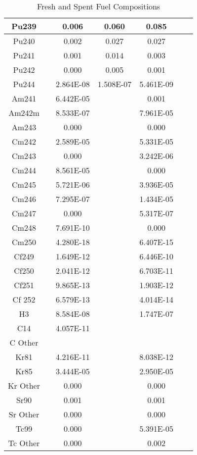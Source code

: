 \begin{frame}
\begin{table}[h]
{\begin{tabular}{|c|c|c|c|c|c|c|}
		 Pu239	 & 	 	& 	0.006 & 	0.060 & 	0.085 \\ \hline 
		 Pu240	 & 	 	& 	0.002 & 	0.027 & 	0.027 \\ \hline 
		 Pu241	 & 	 	& 	0.001 & 	0.014 & 	0.003 \\ \hline 
		 Pu242	 & 	 	& 	0.000 & 	0.005 & 	0.001 \\ \hline 
		 Pu244	 & 	 	& 	2.864E-08 & 1.508E-07 & 	5.461E-09 \\ \hline 
		 Am241	 & 	 	& 	6.442E-05 & 	 	 & 	0.001 \\ \hline 
		 Am242m	 & 	 	& 	8.533E-07 & 	 	 & 	7.961E-05 \\ \hline 
		 Am243	 & 	 	& 	0.000 & 	 	 & 	0.000 \\ \hline 
		 Cm242	 & 	 	& 	2.589E-05 & 	 	 & 	5.331E-05 \\ \hline 
		 Cm243	 & 	 	& 	0.000 & 	 	 & 	3.242E-06 \\ \hline 
		 Cm244	 & 	 	& 	8.561E-05 & 	 	 & 	0.000 \\ \hline 
		 Cm245	 & 	 	& 	5.721E-06 & 	 	 & 	3.936E-05 \\ \hline 
		 Cm246	 & 	 	& 	7.295E-07 & 	 	 & 	1.434E-05 \\ \hline 
		 Cm247	 & 	 	& 	0.000 & 	 	 & 	5.317E-07 \\ \hline 
		 Cm248	 & 	 	& 	7.691E-10 & 	 	 & 	0.000 \\ \hline 
		 Cm250	 & 	 	& 	4.280E-18 & 	 	 & 	6.407E-15 \\ \hline 
		 Cf249	 & 	 	& 	1.649E-12 & 	 	 & 	6.446E-10 \\ \hline 
		 Cf250	 & 	 	& 	2.041E-12 & 	 	 & 	6.703E-11 \\ \hline 
		 Cf251	 & 	 	& 	9.865E-13 & 	 	 & 	1.903E-12 \\ \hline 
		 Cf 252	 & 	 	& 	6.579E-13 & 	 	 & 	4.014E-14 \\ \hline 
		 H3	 & 	 	& 	8.584E-08 & 	 	 & 	1.747E-07 \\ \hline 
		 C14	 & 	 	& 	4.057E-11 & 	 	 & 	 	 \\ \hline 
		 C Other	 & 	 	& 	 	 & 	 	 & 	 	 \\ \hline 
		 Kr81	 & 	 	& 	4.216E-11 & 	 	 & 	8.038E-12 \\ \hline 
		 Kr85	 & 	 	& 	3.444E-05 & 	 	 & 	2.950E-05 \\ \hline 
		 Kr Other	 & 	 	& 	0.000 & 	 	 & 	0.000 \\ \hline 
		 Sr90	 & 	 	& 	0.001 & 	 	 & 	0.001 \\ \hline 
		 Sr Other	 & 	 	& 	0.000 & 	 	 & 	0.000 \\ \hline 
		 Tc99	 & 	 	& 	0.000 & 	 	 & 	5.391E-05 \\ \hline 
		 Tc Other	 & 	 	& 	0.000 & 	 	 & 	0.002 \\ \hline 

		\end{tabular}}
		\caption{Fresh and Spent Fuel Compositions}
		\label{tab:comp}
\end {table}
\end{frame}

